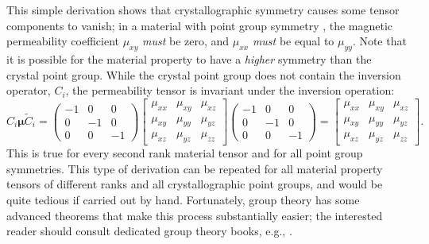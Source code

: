 This simple derivation shows that crystallographic symmetry causes some tensor components to vanish; in a material with point group symmetry , the magnetic permeability coefficient $\mu_{xy}$ \textit{must} be zero, and $\mu_{xx}$ \textit{must} be equal to $\mu_{yy}$.  Note that it is possible for the material property to have a \textit{higher} symmetry than the crystal point group.  While the crystal point group  does not contain the inversion operator, $C_i$, the permeability tensor is invariant under the inversion operation:
{\small\begin{equation}
C_i\bm{\mu}\tilde{C}_i = \begin{pmatrix}-1&0&0\\ 0&-1&0\\ 0&0&-1\end{pmatrix}
	\begin{bmatrix}\mu_{xx}&\mu_{xy}&\mu_{xz}\\ \mu_{xy}&\mu_{yy}&\mu_{yz}\\ \mu_{xz}&\mu_{yz}&\mu_{zz}\end{bmatrix}\begin{pmatrix}-1&0&0\\ 0&-1&0\\ 0&0&-1\end{pmatrix} = 
	\begin{bmatrix}\mu_{xx}&\mu_{xy}&\mu_{xz}\\ \mu_{xy}&\mu_{yy}&\mu_{yz}\\ \mu_{xz}&\mu_{yz}&\mu_{zz}\end{bmatrix}.
\end{equation}}
This is true for every second rank material tensor and for all point group symmetries.  This type of derivation can be repeated for all material property tensors of different ranks and all crystallographic point groups, and would be quite tedious if carried out by hand.  Fortunately, group theory has some advanced theorems that make this process substantially easier; the interested reader should consult dedicated group theory books, e.g., \cite{kiral90a,tinkham64a,mcweeny2002a,rose2003a}. 

